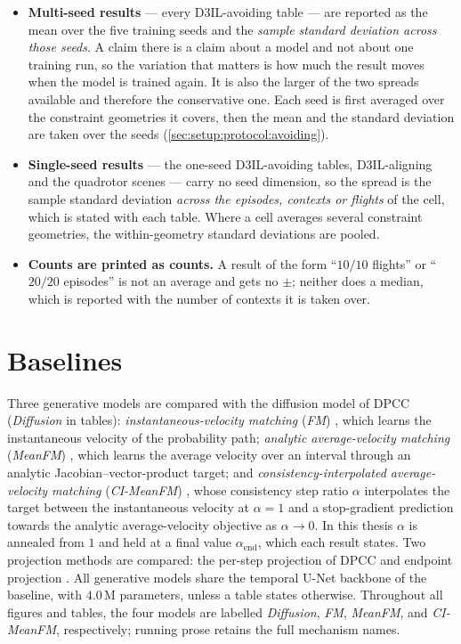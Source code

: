 \begin{itemize}
  \item \textbf{Multi-seed results} --- every D3IL-avoiding table --- are reported as the mean over the
    five training seeds and the \emph{sample standard deviation across those seeds}. A claim there is a
    claim about a model and not about one training run, so the variation that matters is how much the
    result moves when the model is trained again. It is also the larger of the two spreads available and
    therefore the conservative one. Each seed is first averaged over the constraint geometries it covers,
    then the mean and the standard deviation are taken over the seeds
    (\autoref{sec:setup:protocol:avoiding}).
  \item \textbf{Single-seed results} --- the one-seed D3IL-avoiding tables, D3IL-aligning and the
    quadrotor scenes --- carry no seed dimension, so the spread is the sample standard deviation
    \emph{across the episodes, contexts or flights} of the cell, which is stated with each table. Where a
    cell averages several constraint geometries, the within-geometry standard deviations are pooled.
  \item \textbf{Counts are printed as counts.} A result of the form \enquote{$10/10$ flights} or
    \enquote{$20/20$ episodes} is not an average and gets no $\pm$; neither does a median, which is
    reported with the number of contexts it is taken over.
\end{itemize}


\section{Baselines}\label{sec:setup:baselines}

Three generative models are compared with the diffusion model of \ac{DPCC} (\emph{Diffusion} in tables):
\emph{instantaneous-velocity matching} (\emph{FM}) \parencite{lipman2023flow}, which learns the
instantaneous velocity of the probability path; \emph{analytic average-velocity matching}
(\emph{MeanFM}) \parencite{geng2025meanflow}, which learns the average velocity over an interval through
an analytic Jacobian--vector-product target; and \emph{consistency-interpolated average-velocity
matching} (\emph{CI-MeanFM}) \parencite{zhang2025alphaflow}, whose consistency step ratio $\alpha$
interpolates the target between the instantaneous velocity at $\alpha=1$ and a stop-gradient prediction
towards the analytic average-velocity objective as $\alpha\to0$. In this thesis $\alpha$ is annealed from
$1$ and held at a final value
$\alpha_{\mathrm{end}}$, which each result states. Two projection methods are compared: the per-step projection of
\ac{DPCC} and endpoint projection \parencite{li2025hardflow}. All generative models share the temporal
U-Net backbone of the baseline, with $4.0$\,M parameters, unless a table states otherwise. Throughout
all figures and tables, the four models are labelled \emph{Diffusion}, \emph{FM}, \emph{MeanFM}, and
\emph{CI-MeanFM}, respectively; running prose retains the full mechanism names.

